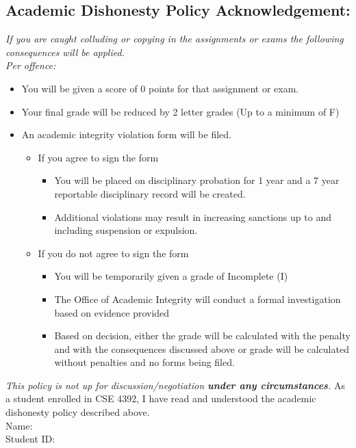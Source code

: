\documentclass{article}
\newcommand{\answerboxbig}{
    \vspace{20cm} %
}
\begin{document}
\answerboxbig

\subsection*{Academic Dishonesty Policy Acknowledgement:}
\textit{If you are caught colluding or copying in the assignments or exams the following consequences will
be applied.}\\
\textit{Per offence:}
\begin{itemize}
    \item You will be given a score of 0 points for that assignment or exam.
    \item Your final grade will be reduced by 2 letter grades (Up to a minimum of F)
    \item An academic integrity violation form will be filed.
    \begin{itemize}
        \item If you agree to sign the form
        \begin{itemize}
            \item You will be placed on disciplinary probation for 1 year and a 7 year reportable
            disciplinary record will be created.
            \item Additional violations may result in increasing sanctions up to and including
            suspension or expulsion.
        \end{itemize}
        \item If you do not agree to sign the form
        \begin{itemize}
            \item You will be temporarily given a grade of Incomplete (I)
            \item The Office of Academic Integrity will conduct a formal investigation based on
            evidence provided
            \item Based on decision, either the grade will be calculated with the penalty and with
            the consequences discussed above or grade will be calculated without
            penalties and no forms being filed.
        \end{itemize}
    \end{itemize}
\end{itemize}
\textit{This policy is not up for discussion/negotiation \textbf{under any circumstances}.}
\newline
As a student enrolled in CSE 4392, I have read and understood the academic dishonesty policy
described above.\\
\newline
Name:\\
Student ID:\\
\end{document}
